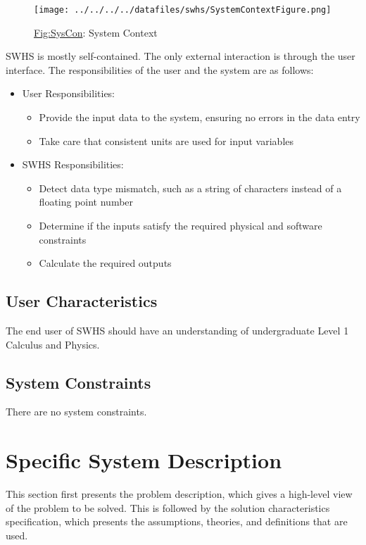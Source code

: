 \documentclass[12pt]{article}
\begin{document}
\begin{figure}
\begin{center}
\texttt{[image: ../../../../datafiles/swhs/SystemContextFigure.png]}
\caption{\hyperref[Figure:SysCon]{Fig:SysCon}: System Context}
\label{Figure:SysCon}
\end{center}
\end{figure}
SWHS is mostly self-contained. The only external interaction is through the user interface. The responsibilities of the user and the system are as follows:

\begin{itemize}
\item{User Responsibilities:}
\begin{itemize}
\item{Provide the input data to the system, ensuring no errors in the data entry}
\item{Take care that consistent units are used for input variables}
\end{itemize}
\item{SWHS Responsibilities:}
\begin{itemize}
\item{Detect data type mismatch, such as a string of characters instead of a floating point number}
\item{Determine if the inputs satisfy the required physical and software constraints}
\item{Calculate the required outputs}
\end{itemize}
\end{itemize}
\subsection{User Characteristics}
\label{Sec:UserChars}
The end user of SWHS should have an understanding of undergraduate Level 1 Calculus and Physics.

\subsection{System Constraints}
\label{Sec:SysConstraints}
There are no system constraints.

\section{Specific System Description}
\label{Sec:SpecSystDesc}
This section first presents the problem description, which gives a high-level view of the problem to be solved. This is followed by the solution characteristics specification, which presents the assumptions, theories, and definitions that are used.
\end{document}
